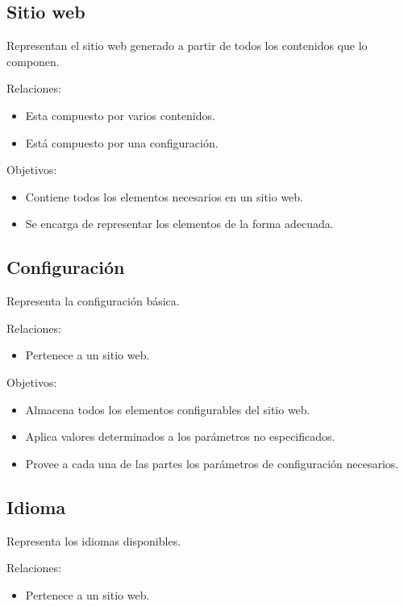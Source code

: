 \subsection{Sitio web}

Representan el sitio web generado a partir de todos los contenidos que lo componen.

Relaciones:
\begin{itemize}
    \item Esta compuesto por varios contenidos.
    \item Está compuesto por una configuración.
\end{itemize}

Objetivos:
\begin{itemize}
    \item Contiene todos los elementos necesarios en un sitio web.
    \item Se encarga de representar los elementos de la forma adecuada.
\end{itemize}

\subsection{Configuración}

Representa la configuración básica.

Relaciones:
\begin{itemize}
    \item Pertenece a un sitio web.
\end{itemize}

Objetivos:
\begin{itemize}
    \item Almacena todos los elementos configurables del sitio web.
    \item Aplica valores determinados a los parámetros no especificados.
    \item Provee a cada una de las partes los parámetros de configuración necesarios.
\end{itemize}

\subsection{Idioma}

Representa los idiomas disponibles.

Relaciones:
\begin{itemize}
    \item Pertenece a un sitio web.
\end{itemize}

